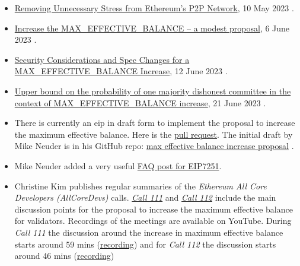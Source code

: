 \documentclass[UTF8]{article}
\begin{document}
\begin{itemize}
\item \href{https://ethresear.ch/t/removing-unnecessary-stress-from-ethereums-p2p-network/15547}{Removing Unnecessary Stress from Ethereum’s P2P Network}, 10 May 2023 \cite{Asgaonkar2023}.
\item \href{https://ethresear.ch/t/increase-the-max-effective-balance-a-modest-proposal/15801/3}{Increase the MAX\_EFFECTIVE\_BALANCE – a modest proposal}, 6 June 2023 \cite{Neuder2023a}.
\item \href{https://notes.ethereum.org/nHqON5l7SACkL\_nPwz8Vqw}{Security Considerations and Spec Changes for a MAX\_EFFECTIVE\_BALANCE Increase}, 12 June 2023 \cite{Neuder2023b}.
\item \href{https://hackmd.io/@0g8QuqEeQBe45CC8toURGw/HylpAVzIH2}{Upper bound on the probability of one majority dishonest committee in the context of MAX\_EFFECTIVE\_BALANCE increase}, 21 June 2023 \cite{Saltini2023}.
\item There is currently an \gls{eip} in draft form to implement the proposal to increase the maximum effective balance. Here is the \href{https://github.com/ethereum/EIPs/pull/7251/commits/ec37fceec914af2a3fd298ef6f6cc13b5d41c533#diff-0e923b63b339f877c14b995b0c69d4962489dce485fb0e31ef49a4dd303e0b56}{pull request}. The initial draft by Mike Neuder is in his GitHub repo: \href{https://github.com/michaelneuder/EIPs/blob/max-eb-increase/EIPS/eip-increase-maxeb.md}{max effective balance increase proposal} \cite{Neuder2023c}.
\item Mike Neuder added a very useful \href{https://notes.ethereum.org/@mikeneuder/eip-7251-faq}{FAQ post for EIP7251}.
\item Christine Kim publishes regular summaries of the \textit{Ethereum All Core Developers (AllCoreDevs)} calls. \href{https://www.galaxy.com/research/insights/ethereum-all-core-developers-consensus-call-111/}{\textit{Call 111}} and \href{https://www.galaxy.com/research/insights/ethereum-all-core-developers-consensus-call-112/}{\textit{Call 112}} include the main discussion points for the proposal to increase the maximum effective balance for validators. Recordings of the meetings are available on YouTube. During \textit{Call 111} the discussion around the increase in maximum effective balance starts around 59 mins (\href{https://youtu.be/ybgQuRcz9sg?t=3569}{recording}) and for \textit{Call 112} the discussion starts around 46 mins (\href{https://youtu.be/zdqtl9x\_UjA?t=2775}{recording})
\end{itemize}
\end{document}
